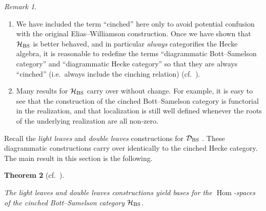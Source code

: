 \documentclass{amsart}
\theoremstyle{plain}
\newtheorem{thm}{Theorem}[section]
\theoremstyle{definition}
\theoremstyle{remark}
\newtheorem{rem}[thm]{Remark}
\numberwithin{equation}{section}
\newcommand{\defnemph}[1]{\emph{#1}}
\DeclareMathOperator{\Hom}{Hom}
\begin{document}
\begin{rem} \hfill
\begin{enumerate}
\item We have included the term ``cinched'' here only to avoid potential confusion with the original Elias--Williamson construction. 
Once we have shown that $\mathcal{H}_{\rm BS}$ is better behaved, and in particular \emph{always} categorifies the Hecke algebra, it is reasonable to redefine the terms ``diagrammatic Bott--Samelson category'' and ``diagrammatic Hecke category'' so that they are always ``cinched'' (i.e.~always include the cinching relation) (cf.~\cite{bowman-book}).

\item Many results for $\mathcal{H}_{\rm BS}$ carry over without change. 
For example, it is easy to see that the construction of the cinched Bott--Samelson category is functorial in the realization, and that localization is still well defined whenever the roots of the underlying realization are all non-zero. 
\end{enumerate}
\end{rem}

Recall the \defnemph{light leaves} and \defnemph{double leaves} constructions for $\mathcal{D}_{\rm BS}$ \cite[\S 6.1, \S 6.3]{EW-SoergelCalc}. 
These diagrammatic constructions carry over identically to the cinched Hecke category. %
The main result in this section is the following. %


\begin{thm}[{cf.~\cite[Theorem 6.11, Proposition 7.6]{EW-SoergelCalc}}] \label{thm:LLcinched} \hfill
%

The light leaves and double leaves constructions yield bases for the $\Hom$-spaces of the cinched Bott--Samelson category $\mathcal{H}_{\rm BS}$.
\end{thm}
\end{document}
